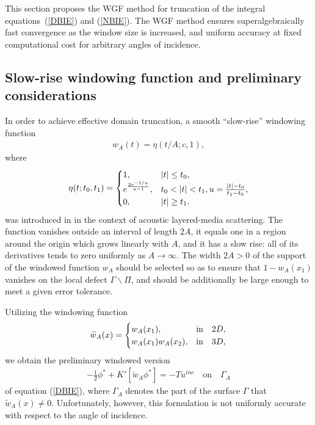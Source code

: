 \documentclass[10pt]{article}
\numberwithin{equation}{section}
\newcommand{\be}{\begin{eqnarray}}
\newcommand{\ben}{\begin{eqnarray*}}
\newcommand{\en}{\end{eqnarray}}
\newcommand{\enn}{\end{eqnarray*}}
\begin{document}
This section proposes the  WGF method for truncation of the
integral equations~(\ref{DBIE}) and (\ref{NBIE}). The WGF
method ensures superalgebraically fast convergence as the window size
is increased, and uniform accuracy at fixed computational cost for
arbitrary angles of incidence.
\vspace{0.5cm}


\subsection{Slow-rise windowing function and preliminary considerations}
\label{sec:3.1}

In order to achieve effective domain truncation, a smooth ``slow-rise''
windowing function
\ben
w_A(t)=\eta(t/A;c,1), \enn where \ben \eta(t;t_0,t_1)=\begin{cases} 1,
  & |t|\le t_0, \cr e^{\frac{2e^{-1/u}}{u-1}}, & t_0<|t|<t_1,
  u=\frac{|t|-t_0}{t_1-t_0}, \cr 0, & |t|\ge t_1.
\end{cases}
\enn was introduced in \cite{BLPT16,P16} in the context of acoustic
layered-media scattering. The function vanishes outside an interval of
length $2A$, it equals one in a region around the origin which grows
linearly with $A$, and it has a slow rise: all of its derivatives
tends to zero uniformly as $A\to\infty$. The width $2A>0$ of the
support of the windowed function $w_A$ should be selected so as to
ensure that $1-w_A(x_1)$ vanishes on the local defect
$\Gamma\backslash\Pi$, and should be additionally be large enough to
meet a given error tolerance.

Utilizing the windowing function
\ben
\widetilde{w}_A(x)=\begin{cases}
w_A(x_1) , & \mbox{in}\quad 2D,\cr
w_A(x_1)w_A(x_2), & \mbox{in}\quad 3D,
\end{cases}
\enn
we obtain the preliminary windowed version
\be
\label{WDBIE1}
-\frac{1}{2}\phi^*+K'[\widetilde{w}_A\phi^*]=-Tu^{inc}
\quad\mbox{on}\quad\Gamma_A \en of equation (\ref{DBIE}), where
$\Gamma_A$ denotes the part of the surface $\Gamma$ that
$\widetilde{w}_A(x)\ne 0$. Unfortunately, however, this formulation is
not uniformly accurate with respect to the angle of incidence.
\end{document}
